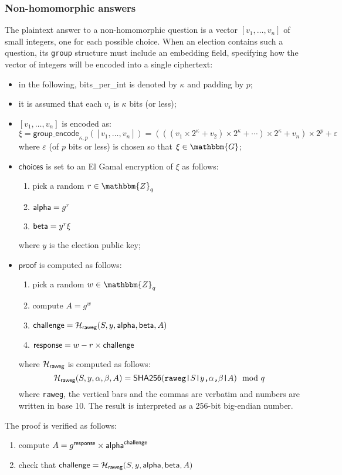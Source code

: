 \documentclass[a4paper]{article}
\newcommand{\G}{\mathbbm{G}}
\newcommand{\Z}{\mathbbm{Z}}
\newcommand{\shatwo}{\textsf{SHA256}}
\begin{document}
\subsubsection{Non-homomorphic answers}
\label{nh-answers}

The plaintext answer to a non-homomorphic question is a vector
$[v_1,\dots,v_n]$ of small integers, one for each possible
choice. When an election contains such a question, its \texttt{group}
structure must include an \textsf{embedding} field, specifying how the
vector of integers will be encoded into a single ciphertext:
\begin{itemize}
\item in the following, \textsf{bits\_per\_int} is denoted by $\kappa$
  and \textsf{padding} by $p$;
\item it is assumed that each $v_i$ is $\kappa$ bits (or less);
\item $[v_1,\dots,v_n]$ is encoded as:
  \[
    \xi=\textsf{group\_encode}_{\kappa,p}([v_1,\dots,v_n])=(((v_1\times
    2^\kappa+v_2)\times 2^\kappa+\dotsb)\times 2^\kappa+v_n)\times
    2^p+\varepsilon
  \]
  where $\varepsilon$ (of $p$ bits or less) is chosen so that $\xi\in\G$;
\item $\textsf{choices}$ is set to an El Gamal encryption of $\xi$ as
  follows:
  \begin{enumerate}
  \item pick a random $r\in\Z_q$
  \item $\textsf{alpha}=g^r$
  \item $\textsf{beta}=y^r\xi$
  \end{enumerate}
  where $y$ is the election public key;
\item $\textsf{proof}$ is computed as follows:
  \begin{enumerate}
  \item pick a random $w\in\Z_q$
  \item compute $A=g^w$
  \item $\textsf{challenge}=\mathcal{H}_{\textsf{raweg}}(S,y,\textsf{alpha},\textsf{beta},A)$
  \item $\textsf{response}=w-r\times\textsf{challenge}$
  \end{enumerate}
  where $\mathcal{H}_{\textsf{raweg}}$ is computed as follows:
  \[
    \Hash_{\textsf{raweg}}(S,y,\alpha,\beta,A)=\shatwo(\verb=raweg|=S\verb=|=y\verb=,=\alpha\verb=,=\beta\verb=|=A)\mod q
  \]
  where \verb=raweg=, the vertical bars and the commas are verbatim and
  numbers are written in base 10. The result is interpreted as a 256-bit
  big-endian number.
\end{itemize}
The proof is verified as follows:
\begin{enumerate}
\item compute $A=g^{\textsf{response}}\times\textsf{alpha}^{\textsf{challenge}}$
\item check that $\textsf{challenge}=\mathcal{H}_{\textsf{raweg}}(S,y,\textsf{alpha},\textsf{beta},A)$
\end{enumerate}
\end{document}
